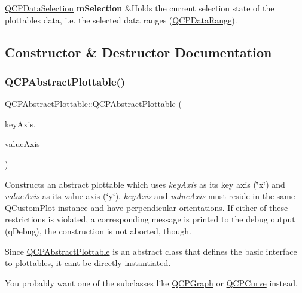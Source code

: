 \begin{longtabu}
\mbox{\hyperlink{class_q_c_p_data_selection}{Q\+C\+P\+Data\+Selection}} {\bfseries{m\+Selection}}  &Holds the current selection state of the plottable\textquotesingle{}s data, i.\+e. the selected data ranges (\mbox{\hyperlink{class_q_c_p_data_range}{Q\+C\+P\+Data\+Range}}).  \\
\end{longtabu}


\subsection{Constructor \& Destructor Documentation}
\mbox{\label{class_q_c_p_abstract_plottable_af78a036e40db6f53a31abadc5323715a}} 
\subsubsection{\texorpdfstring{QCPAbstractPlottable()}{QCPAbstractPlottable()}}
{\footnotesize\ttfamily Q\+C\+P\+Abstract\+Plottable\+::\+Q\+C\+P\+Abstract\+Plottable (\begin{DoxyParamCaption}\item[{\mbox{\hyperlink{class_q_c_p_axis}{Q\+C\+P\+Axis}} $\ast$}]{key\+Axis,  }\item[{\mbox{\hyperlink{class_q_c_p_axis}{Q\+C\+P\+Axis}} $\ast$}]{value\+Axis }\end{DoxyParamCaption})}

Constructs an abstract plottable which uses {\itshape key\+Axis} as its key axis (\char`\"{}x\char`\"{}) and {\itshape value\+Axis} as its value axis (\char`\"{}y\char`\"{}). {\itshape key\+Axis} and {\itshape value\+Axis} must reside in the same \mbox{\hyperlink{class_q_custom_plot}{Q\+Custom\+Plot}} instance and have perpendicular orientations. If either of these restrictions is violated, a corresponding message is printed to the debug output (q\+Debug), the construction is not aborted, though.

Since \mbox{\hyperlink{class_q_c_p_abstract_plottable}{Q\+C\+P\+Abstract\+Plottable}} is an abstract class that defines the basic interface to plottables, it can\textquotesingle{}t be directly instantiated.

You probably want one of the subclasses like \mbox{\hyperlink{class_q_c_p_graph}{Q\+C\+P\+Graph}} or \mbox{\hyperlink{class_q_c_p_curve}{Q\+C\+P\+Curve}} instead. \mbox{\label{class_q_c_p_abstract_plottable_a88112bcbe9eb995b1190ad7591f2d0b5}} 
